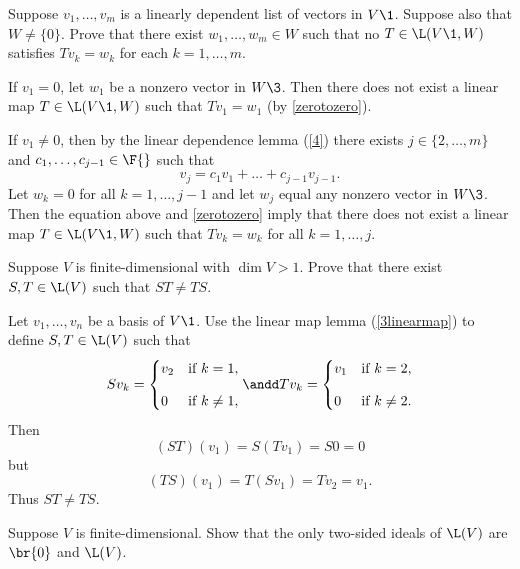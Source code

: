 \exercise
Suppose $v_1, \dots, v_m$ is a linearly dependent list of vectors in $V\1$. Suppose also that $W \ne \{0\}$. Prove that there exist $w_1, \dots, w_m \in W$ such that no $T \in \L(V\1, W)$ satisfies $Tv_k = w_k$ for each $k = 1, \dots, m$.

\begin{Solution}
If $v_1 = 0$, let $w_1$ be a nonzero vector in $W\3$. Then there does not exist a linear map $T \in \L(V\1, W)$ such that $Tv_1 = w_1$ (by \ref{zerotozero}).

If $v_1 \ne 0$, then by the linear dependence lemma (\ref{4}) there exists $j \in \{2, \dots, m\}$  and $c_1, \dots , c_{j-1} \in \F{}$ such that
\[
v_j = c_1 v_1 + \dots + c_{j-1} v_{j-1}.
\]
Let $w_k = 0$ for all $k = 1, \dots, j-1$ and let $w_j$ equal any nonzero vector in $W\3$. Then the equation above and \ref{zerotozero} imply that there does not exist a linear map $T \in \L(V\1, W)$ such that $Tv_k = w_k$ for all $k = 1, \dots, j$.
\end{Solution}

\exercise
Suppose $V$ is finite-dimensional with $\dim V > 1$. Prove that there exist $S, T \in \L(V)$ such that $ST \ne TS$. \label{noncomm}

\begin{Solution}
Let $v_1, \dots, v_n$ be a basis of $V\1$. Use the linear map lemma (\ref{3linearmap}) to define $S, T \in \L(V)$ such that
\[
Sv_k =
\begin{cases}
v_2 & \text{if } k = 1,\\[9bp]
0 & \text{if } k \ne 1,
\end{cases}
\andd
Tv_k =
\begin{cases}
v_1 & \text{if } k = 2,\\[9bp]
0 & \text{if } k \ne 2.
\end{cases}
\]
Then
\[
(ST)(v_1) = S(Tv_1) = S0 = 0
\]
but
\[
(TS)(v_1) = T(Sv_1) = Tv_2 = v_1.
\]
Thus $ST \ne TS$.
\end{Solution}

\exercise
Suppose $V$ is finite-dimensional. Show that the only two-sided ideals of $\L(V)$ are $\br{0}$ and $\L(V)$.
\label{ideals}


